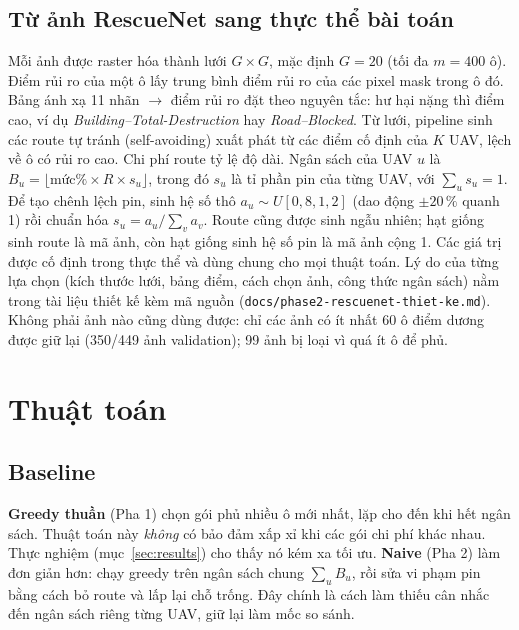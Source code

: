 \documentclass[conference]{IEEEtran}
\begin{document}
\subsection{Từ ảnh RescueNet sang thực thể bài toán}
Mỗi ảnh được raster hóa thành lưới $G \times G$, mặc định $G=20$ (tối đa $m = 400$ ô). Điểm
rủi ro của một ô lấy trung bình điểm rủi ro của các pixel mask trong ô đó. Bảng ánh xạ 11
nhãn $\to$ điểm rủi ro đặt theo nguyên tắc: hư hại nặng thì điểm cao, ví dụ
\emph{Building--Total-Destruction} hay \emph{Road--Blocked}. Từ lưới, pipeline sinh các
route tự tránh (self-avoiding) xuất phát từ các điểm cố định của $K$ UAV, lệch về ô có rủi ro cao. Chi phí route tỷ lệ độ dài. Ngân sách của UAV $u$ là $B_u = \lfloor \text{mức\%} \times R \times s_u \rfloor$,
trong đó $s_u$ là tỉ phần pin của từng UAV, với $\sum_u s_u=1$.
Để tạo chênh lệch pin, sinh hệ số thô $a_u \sim U[0{,}8,1{,}2]$ (dao động
$\pm 20\,\%$ quanh 1) rồi chuẩn hóa $s_u=a_u/\sum_v a_v$.
Route cũng được sinh ngẫu nhiên; hạt giống sinh route là mã ảnh, còn hạt giống sinh
hệ số pin là mã ảnh cộng 1. Các giá trị được cố định trong thực thể và dùng chung cho
mọi thuật toán. Lý do của từng lựa chọn (kích thước lưới, bảng điểm, cách chọn
ảnh, công thức ngân sách) nằm trong tài liệu thiết kế kèm mã nguồn
(\texttt{docs/phase2-rescuenet-thiet-ke.md}). Không phải ảnh nào cũng dùng được: chỉ các
ảnh có ít nhất 60 ô điểm dương được giữ lại (350/449 ảnh validation); 99 ảnh bị loại vì quá
ít ô để phủ.

\section{Thuật toán}
\label{sec:algorithm}

\subsection{Baseline}
\textbf{Greedy thuần} (Pha 1) chọn gói phủ nhiều ô mới nhất, lặp cho đến khi hết ngân sách.
Thuật toán này \emph{không} có bảo đảm xấp xỉ khi các gói chi phí khác nhau. Thực nghiệm
(mục~\ref{sec:results}) cho thấy nó kém xa tối ưu. \textbf{Naive} (Pha 2) làm đơn giản hơn:
chạy greedy trên ngân sách chung $\sum_u B_u$, rồi sửa vi phạm pin bằng cách bỏ route và lấp
lại chỗ trống. Đây chính là cách làm thiếu cân nhắc đến ngân sách riêng từng UAV, giữ lại
làm mốc so sánh.
\end{document}
